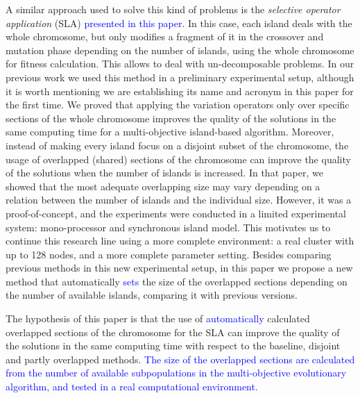 \documentclass[preprint]{elsarticle}
\begin{document}
A similar approach used to solve this kind of problems is the {\em
  selective operator application} (SLA) \textcolor{blue}{presented in this paper}. In this case, each island
deals with the whole chromosome, but only modifies a fragment of it in
the crossover and mutation phase depending on the number of islands,
using the whole chromosome for fitness calculation. This allows to
deal with un-decomposable problems. %
In our previous work \citep{Garcia16hpmoon} we used this method in a
preliminary experimental setup, although it is worth mentioning we are
establishing its name and acronym in this paper for the first time.
We proved 
that applying the variation operators only over specific sections of the whole chromosome improves the quality of the solutions in the same computing time for a multi-objective island-based algorithm.
Moreover, instead of making every island focus on a disjoint subset of the
chromosome, the usage of overlapped (shared) sections of the
chromosome 
can improve the quality of the solutions 
when the number of islands is increased. In that paper, we showed that the most
adequate overlapping size may vary depending on a relation between the
number of islands and the individual size. However, it was a proof-of-concept, and the experiments
were conducted in a limited experimental system: mono-processor and
synchronous island model. %
This
motivates us to continue this research line using a more complete environment: a real cluster with up to 128 nodes, and a more complete parameter setting. Besides comparing previous methods in this new experimental setup, in this paper we propose
a new method that automatically \textcolor{blue}{sets} the size of the overlapped
sections depending on the number of available islands, comparing it with previous versions. 




The hypothesis of this paper is that the use of \textcolor{blue}{automatically} calculated overlapped sections of the
chromosome for the SLA can improve the
quality of the solutions in the same computing time with respect to
the baseline, disjoint and partly overlapped methods. 
\textcolor{blue}{The size of the overlapped sections are calculated from  the number of available subpopulations in the multi-objective evolutionary algorithm, and tested in a real computational environment.}
\end{document}
